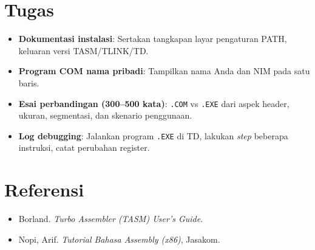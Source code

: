 \section{Tugas}
\begin{itemize}
  \item \textbf{Dokumentasi instalasi}: Sertakan tangkapan layar pengaturan PATH, keluaran versi TASM/TLINK/TD.
  \item \textbf{Program COM nama pribadi}: Tampilkan nama Anda dan NIM pada satu baris.
  \item \textbf{Esai perbandingan (300--500 kata)}: \texttt{.COM} vs \texttt{.EXE} dari aspek header, ukuran, segmentasi, dan skenario penggunaan.
  \item \textbf{Log debugging}: Jalankan program \texttt{.EXE} di TD, lakukan \textit{step} beberapa instruksi, catat perubahan register.
\end{itemize}

\section{Referensi}
\begin{itemize}
  \item Borland. \textit{Turbo Assembler (TASM) User's Guide}.
  \item Nopi, Arif. \textit{Tutorial Bahasa Assembly (x86)}, Jasakom.
\end{itemize}
